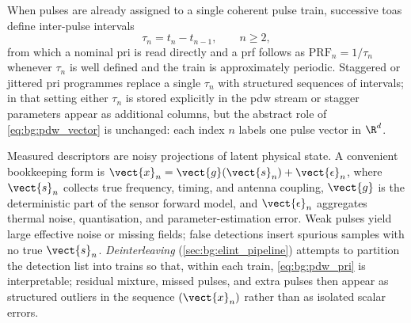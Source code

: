 When pulses are already assigned to a single coherent pulse train, successive \glspl{toa} define inter-pulse intervals
\begin{equation}\label{eq:bg:pdw_pri}
  \tau_n = t_n - t_{n-1}, \qquad n \ge 2,
\end{equation}
from which a nominal \gls{pri} is read directly and a \gls{prf} follows as $\mathrm{PRF}_n = 1/\tau_n$ whenever $\tau_n$ is well defined and the train is approximately periodic.
Staggered or jittered \gls{pri} programmes replace a single $\tau_n$ with structured sequences of intervals; in that setting either $\tau_n$ is stored explicitly in the \gls{pdw} stream or stagger parameters appear as additional columns, but the abstract role of \cref{eq:bg:pdw_vector} is unchanged: each index $n$ labels one pulse vector in $\R^{d}$.

Measured descriptors are noisy projections of latent physical state.
A convenient bookkeeping form is $\vect{x}_n = \vect{g}(\vect{s}_n) + \vect{\epsilon}_n$, where $\vect{s}_n$ collects true frequency, timing, and antenna coupling, $\vect{g}$ is the deterministic part of the sensor forward model, and $\vect{\epsilon}_n$ aggregates thermal noise, quantisation, and parameter-estimation error.
Weak pulses yield large effective noise or missing fields; false detections insert spurious samples with no true $\vect{s}_n$.
\emph{Deinterleaving} (\cref{sec:bg:elint_pipeline}) attempts to partition the detection list into trains so that, within each train, \cref{eq:bg:pdw_pri} is interpretable; residual mixture, missed pulses, and extra pulses then appear as structured outliers in the sequence $(\vect{x}_n)$ rather than as isolated scalar errors.
